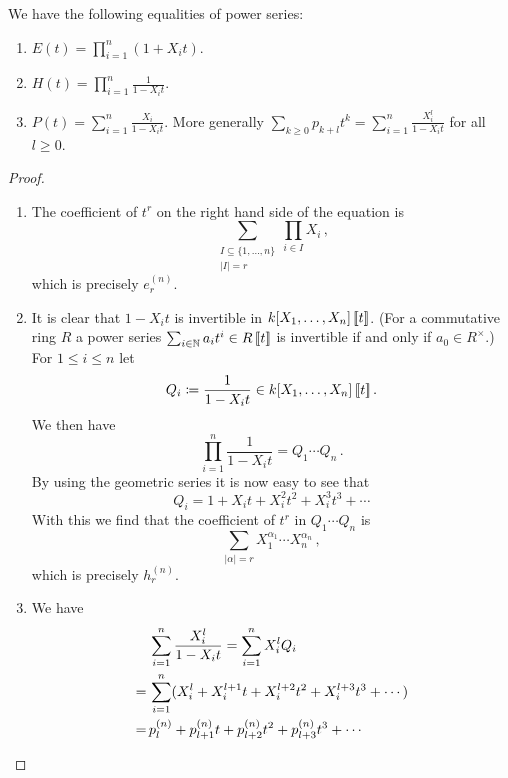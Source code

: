 \begin{proposition}
  We have the following equalities of power series:
  \begin{enumerate}[label=\emph{\alph*)},leftmargin=*]
    \item
      $E(t) = \prod_{i=1}^n (1 + X_i t)$.
    \item
      $H(t) = \prod_{i=1}^n \frac{1}{1 - X_i t}$.
    \item
      $P(t) = \sum_{i=1}^n \frac{X_i}{1 - X_i t}$.
      More generally $\sum_{k \geq 0} p_{k+l} t^k = \sum_{i=1}^n \frac{X_i^l}{1 - X_i t}$ for all $l \geq 0$.
  \end{enumerate}
\end{proposition}
\begin{proof}
  \begin{enumerate}[label=\emph{\alph*)},leftmargin=*]
    \item
      The coefficient of $t^r$ on the right hand side of the equation is
      \[
        \sum_{\substack{I \subseteq \{1, \dotsc, n\} \\ |I| = r}} \prod_{i \in I} X_i \,,
      \]
      which is precisely $e^{(n)}_r$.
    \item
      It is clear that $1-X_i t$ is invertible in $k[X_1, \dotsc, X_n]\left[\!\left[t\right]\!\right]$.
      (For a commutative ring $R$ a power series $\sum_{i \in \mathbb{N}} a_i t^i \in R\left[\!\left[t\right]\!\right]$ is invertible if and only if $a_0 \in R^\times$.)
      For $1 \leq i \leq n$ let
      \[
                  Q_i
        \coloneqq \frac{1}{1-X_i t} \in k[X_1, \dotsc, X_n] \left[\!\left[t\right]\!\right] .
      \]
      We then have
      \[
          \prod_{i=1}^n \frac{1}{1-X_i t}
        = Q_1 \dotsm Q_n \,.
      \]
      By using the geometric series it is now easy to see that
      \[
          Q_i
        = 1 + X_i t + X_i^2 t^2 + X_i^3 t^3 + \dotsb
      \]
      With this we find that the coefficient of $t^r$ in $Q_1 \dotsm Q_n$ is
      \[
        \sum_{|\alpha| = r} X_1^{\alpha_1} \dotsm X_n^{\alpha_n} \,,
      \]
      which is precisely $h^{(n)}_r$.
    \item
      We have
      \begin{align*}
         &\, \sum_{i=1}^n \frac{X_i^l}{1-X_i t}
        =    \sum_{i=1}^n X_i^l Q_i \\
        =&\, \sum_{i=1}^n (X_i^l + X_i^{l+1} t + X_i^{l+2} t^2 + X_i^{l+3} t^3 + \dotsb) \\
        =&\, p^{(n)}_l + p^{(n)}_{l+1} t + p^{(n)}_{l+2} t^2 + p^{(n)}_{l+3} t^3 + \dotsb
        \qedhere
      \end{align*}
  \end{enumerate}
\end{proof}


